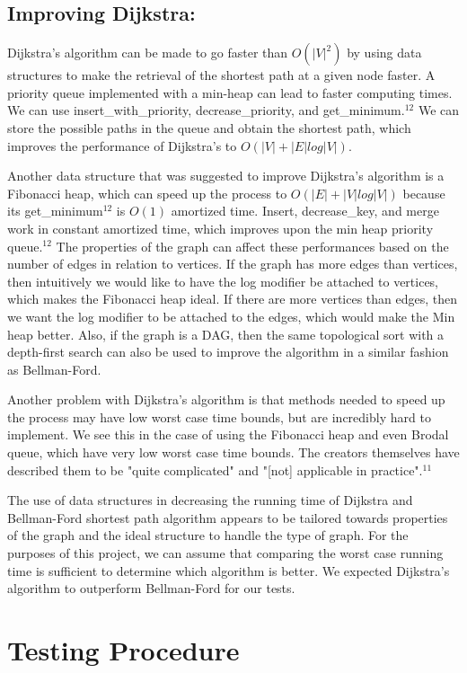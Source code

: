 \documentclass{article}
\begin{document}
\subsection{Improving Dijkstra:}
Dijkstra's algorithm can be made to go faster than $O(|V|^2)$ by using data structures to make the retrieval of the shortest path at a given node faster. A priority queue implemented with a min-heap can lead to faster computing times. We can use insert\_with\_priority, decrease\_priority, and get\_minimum.$^{12}$ We can store the possible paths in the queue and obtain the shortest path, which improves the performance of Dijkstra's to $O(|V|+|E|log |V|)$. 
	
	
Another data structure that was suggested to improve Dijkstra's algorithm is a Fibonacci heap, which can speed up the process to $O(|E| + |V| log |V|)$ because its get\_minimum$^{12}$ is $O(1)$ amortized time. Insert, decrease\_key, and merge work in constant amortized time, which improves upon the min heap priority queue.$^{12}$ The properties of the graph can affect these performances based on the number of edges in relation to vertices. If the graph has more edges than vertices, then intuitively we would like to have the log modifier be attached to vertices, which makes the Fibonacci heap ideal. If there are more vertices than edges, then we want the log modifier to be attached to the edges, which would make the Min heap better. Also, if the graph is a DAG, then the same topological sort with a depth-first search can also be used to improve the algorithm in a similar fashion as Bellman-Ford. 


Another problem with Dijkstra's algorithm is that methods needed to speed up the process may have low worst case time bounds, but are incredibly hard to implement. We see this in the case of using the Fibonacci heap and even Brodal queue, which have very low worst case time bounds.  The creators themselves have described them to be "quite complicated" and "[not] applicable in practice".$^{11}$


The use of data structures in decreasing the running time of Dijkstra and Bellman-Ford shortest path algorithm appears to be tailored towards properties of the graph and the ideal structure to handle the type of graph. For the purposes of this project, we can assume that comparing the worst case running time is sufficient to determine which algorithm is better. We expected Dijkstra's algorithm to outperform Bellman-Ford for our tests.


\section{Testing Procedure}
\end{document}
